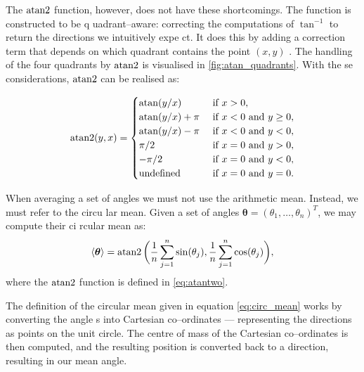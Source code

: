 The $\operatorname{atan2}$ function, however, does not have these shortcomings. The function is constructed to be q
uadrant--aware: correcting the computations of $\tan^{-1}$ to return the directions we intuitively expe
ct. It does this by adding a correction term that depends on which quadrant contains the point $(x, y)$
. The handling of the four quadrants by $\operatorname{atan2}$ is visualised in \cref{fig:atan_quadrants}. With the
se considerations, $\operatorname{atan2}$ can be realised as:

\begin{equation}
\label{eq:atantwo}
	\atantwo(y, x) = 
	\begin{cases}
		\atan(y/x) & \text{ if } x > 0, \\
		\atan(y/x) + \pi & \text{ if } x < 0 \text{ and } y \geq 0, \\
		\atan(y/x) - \pi & \text{ if } x < 0 \text{ and } y < 0, \\
		\pi/2  & \text{ if } x = 0 \text{ and } y > 0, \\
		- \pi/2 & \text{ if } x = 0 \text{ and } y < 0, \\
		\text{undefined} & \text{ if } x = 0 \text{ and } y = 0. \\
	\end{cases}
\end{equation}

When averaging a set of angles we must not use the arithmetic mean. Instead, we must refer to the circu
lar mean. Given a set of angles $\bm{\theta} = (\theta_1, \ldots, \theta_n)^T$, we may compute their ci
rcular mean as:
\begin{equation}
	\label{eq:circ_mean}
	\langle \bm{\theta} \rangle = \operatorname{atan2}\bigg(\frac{1}{n} \sum_{j=1}^n \sin(\theta_j), \frac{1}{n} \sum_
{j=1}^n \cos(\theta_j)\bigg),
\end{equation}
where the $\operatorname{atan2}$ function is defined in \cref{eq:atantwo}.

The definition of the circular mean given in equation \cref{eq:circ_mean} works by converting the angle
s into Cartesian co--ordinates --- representing the directions as points on the unit circle. The centre
 of mass of the Cartesian co--ordinates is then computed, and the resulting position is converted back 
to a direction, resulting in our mean angle.

